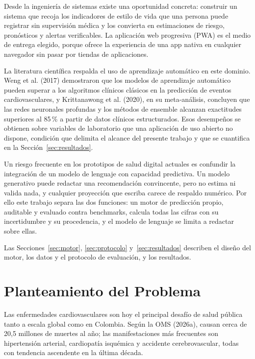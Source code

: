 \documentclass[12pt,letterpaper]{article}
\begin{document}
Desde la ingeniería de sistemas existe una oportunidad concreta: construir un
sistema que recoja los indicadores de estilo de vida que una persona puede
registrar sin supervisión médica y los convierta en estimaciones de riesgo,
pronósticos y alertas verificables. La aplicación web progresiva (PWA) es el
medio de entrega elegido, porque ofrece la experiencia de una app nativa en
cualquier navegador sin pasar por tiendas de aplicaciones.

La literatura científica respalda el uso de aprendizaje automático en este
dominio. Weng et al. (2017) demostraron que los modelos de aprendizaje automático
pueden superar a los algoritmos clínicos clásicos en la predicción de eventos
cardiovasculares, y Krittanawong et al. (2020), en su meta-análisis, concluyen
que las redes neuronales profundas y los métodos de ensemble alcanzan exactitudes
superiores al 85\,\% a partir de datos clínicos estructurados. Esos desempeños se
obtienen sobre variables de laboratorio que una aplicación de uso abierto no
dispone, condición que delimita el alcance del presente trabajo y que se
cuantifica en la Sección~\ref{sec:resultados}.

Un riesgo frecuente en los prototipos de salud digital actuales es confundir la
integración de un modelo de lenguaje con capacidad predictiva. Un modelo
generativo puede redactar una recomendación convincente, pero no estima ni
valida nada, y cualquier proyección que escriba carece de respaldo numérico. Por
ello este trabajo separa las dos funciones: un motor de predicción propio,
auditable y evaluado contra benchmarks, calcula todas las cifras con su
incertidumbre y su procedencia, y el modelo de lenguaje se limita a redactar
sobre ellas.

Las Secciones~\ref{sec:motor}, \ref{sec:protocolo} y~\ref{sec:resultados}
describen el diseño del motor, los datos y el protocolo de evaluación, y los
resultados.

\newpage

\section{Planteamiento del Problema}

Las enfermedades cardiovasculares son hoy el principal desafío de salud pública
tanto a escala global como en Colombia. Según la OMS (2026a), causan cerca de
20,5 millones de muertes al año; las manifestaciones más frecuentes son
hipertensión arterial, cardiopatía isquémica y accidente cerebrovascular, todas
con tendencia ascendente en la última década.
\end{document}
